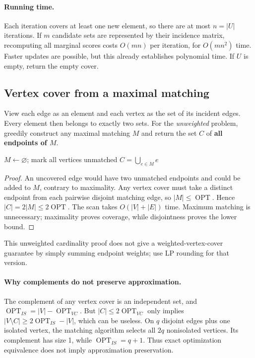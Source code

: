 \documentclass[10pt]{article}
\theoremstyle{definition}
\newcommand{\OPT}{\operatorname{OPT}}
\begin{document}
\paragraph{Running time.}
Each iteration covers at least one new element, so there are at most $n=|U|$ iterations.
If $m$ candidate sets are represented by their incidence matrix, recomputing all marginal
scores costs $O(mn)$ per iteration, for $O(mn^2)$ time. Faster updates are possible, but this
already establishes polynomial time. If $U$ is empty, return the empty cover.


\subsection{Vertex cover from a maximal matching}
\label{gre:vc}
View each edge as an element and each vertex as the set of its incident edges. Every
element then belongs to exactly two sets. For the \emph{unweighted} problem, greedily
construct any maximal matching $M$ and return the set $C$ of \textbf{all endpoints of $M$}.

\begin{algorithm}[H]
\caption{Maximal-matching vertex cover}
$M\gets\varnothing$; mark all vertices unmatched\;
\Return $C=\bigcup_{e\in M}e$\;
\end{algorithm}
\begin{proof}
An uncovered edge would have two unmatched endpoints and could be added to $M$, contrary
to maximality. Any vertex cover must take a distinct endpoint from each pairwise disjoint
matching edge, so $|M|\le\OPT$. Hence $|C|=2|M|\le2\OPT$.
The scan takes $O(|V|+|E|)$ time. Maximum matching is unnecessary; maximality proves
coverage, while disjointness proves the lower bound.
\end{proof}
This unweighted cardinality proof does not give a weighted-vertex-cover guarantee by
simply summing endpoint weights; use LP rounding for that version.

\paragraph{Why complements do not preserve approximation.}
The complement of any vertex cover is an independent set, and $\OPT_{IS}=|V|-\OPT_{VC}$.
But $|C|\le2\OPT_{VC}$ only implies
$|V\setminus C|\ge2\OPT_{IS}-|V|$, which can be useless. On $q$ disjoint edges plus one
isolated vertex, the matching algorithm selects all $2q$ nonisolated vertices. Its complement
has size 1, while $\OPT_{IS}=q+1$. Thus exact optimization equivalence does not imply
approximation preservation.
\end{document}
